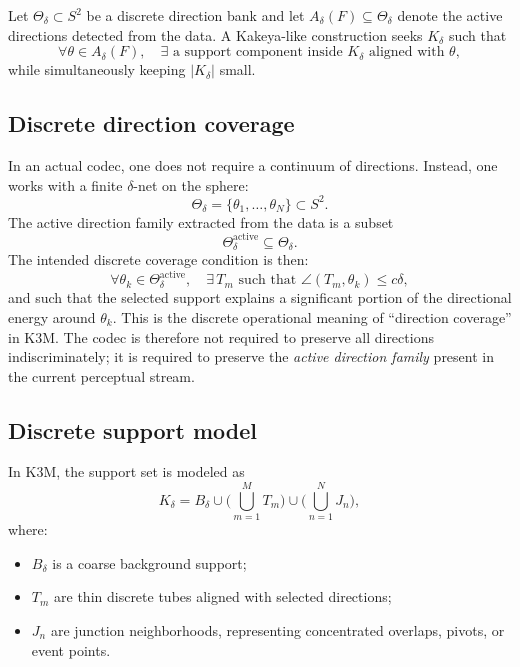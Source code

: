 \documentclass[11pt]{article}
\begin{document}
Let $\Theta_\delta\subset S^2$ be a discrete direction bank and let $A_\delta(F)\subseteq\Theta_\delta$ denote the active directions detected from the data. A Kakeya-like construction seeks $K_\delta$ such that
\begin{equation}
\forall \theta\in A_\delta(F),\quad \exists \text{ a support component inside } K_\delta \text{ aligned with } \theta,
\end{equation}
while simultaneously keeping $|K_\delta|$ small.

\subsection{Discrete direction coverage}
In an actual codec, one does not require a continuum of directions. Instead, one works with a finite $\delta$-net on the sphere:
\begin{equation}
\Theta_\delta = \{\theta_1,\ldots,\theta_N\}\subset S^2.
\end{equation}
The active direction family extracted from the data is a subset
\begin{equation}
\Theta_\delta^{\mathrm{active}} \subseteq \Theta_\delta.
\end{equation}
The intended discrete coverage condition is then:
\begin{equation}
\forall \theta_k\in \Theta_\delta^{\mathrm{active}},
\quad
\exists\, T_m
\text{ such that }
\angle(T_m,\theta_k)\le c\delta,
\end{equation}
and such that the selected support explains a significant portion of the directional energy around $\theta_k$. This is the discrete operational meaning of ``direction coverage'' in K3M. The codec is therefore not required to preserve all directions indiscriminately; it is required to preserve the \emph{active direction family} present in the current perceptual stream.

\subsection{Discrete support model}
In K3M, the support set is modeled as
\begin{equation}
K_\delta = B_\delta \cup \Big(\bigcup_{m=1}^{M} T_m\Big)\cup \Big(\bigcup_{n=1}^{N} J_n\Big),
\end{equation}
where:
\begin{itemize}[leftmargin=1.5em]
\item $B_\delta$ is a coarse background support;
\item $T_m$ are thin discrete tubes aligned with selected directions;
\item $J_n$ are junction neighborhoods, representing concentrated overlaps, pivots, or event points.
\end{itemize}
\end{document}
